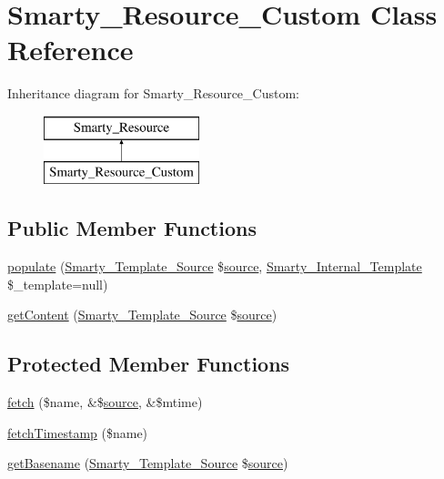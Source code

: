\hypertarget{class_smarty___resource___custom}{}\section{Smarty\+\_\+\+Resource\+\_\+\+Custom Class Reference}
\label{class_smarty___resource___custom}
Inheritance diagram for Smarty\+\_\+\+Resource\+\_\+\+Custom\+:\begin{figure}[H]
\begin{center}
\leavevmode
\includegraphics[height=2.000000cm]{class_smarty___resource___custom}
\end{center}
\end{figure}
\subsection*{Public Member Functions}
\begin{DoxyCompactItemize}
\item 
\hyperlink{class_smarty___resource___custom_a07a771f460d625d63fcb72d0aeed0b01}{populate} (\hyperlink{class_smarty___template___source}{Smarty\+\_\+\+Template\+\_\+\+Source} \$\hyperlink{class_smarty___resource_ab6ac6b66dac2da6c41a178102f7d53e4}{source}, \hyperlink{class_smarty___internal___template}{Smarty\+\_\+\+Internal\+\_\+\+Template} \$\+\_\+template=null)
\item 
\hyperlink{class_smarty___resource___custom_a0e40116a3d4f59cf7ea39f83441169b8}{get\+Content} (\hyperlink{class_smarty___template___source}{Smarty\+\_\+\+Template\+\_\+\+Source} \$\hyperlink{class_smarty___resource_ab6ac6b66dac2da6c41a178102f7d53e4}{source})
\end{DoxyCompactItemize}
\subsection*{Protected Member Functions}
\begin{DoxyCompactItemize}
\item 
\hyperlink{class_smarty___resource___custom_a8e81cbbd901d56aeadbf8a86b94294e0}{fetch} (\$name, \&\$\hyperlink{class_smarty___resource_ab6ac6b66dac2da6c41a178102f7d53e4}{source}, \&\$mtime)
\item 
\hyperlink{class_smarty___resource___custom_a18318497e579c8c629c4916aa8fc6417}{fetch\+Timestamp} (\$name)
\item 
\hyperlink{class_smarty___resource___custom_a91cdf7da12bdc51906539506dd26159b}{get\+Basename} (\hyperlink{class_smarty___template___source}{Smarty\+\_\+\+Template\+\_\+\+Source} \$\hyperlink{class_smarty___resource_ab6ac6b66dac2da6c41a178102f7d53e4}{source})
\end{DoxyCompactItemize}
